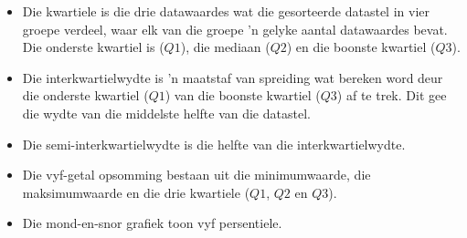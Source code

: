\begin{itemize}[itemsep=6pt]
\item Die kwartiele is die drie datawaardes wat die gesorteerde datastel in vier groepe verdeel, waar elk van die groepe ’n gelyke aantal datawaardes bevat. Die onderste kwartiel is ($Q1$), die mediaan ($Q2$) en die boonste kwartiel ($Q3$).

\item Die interkwartielwydte is ’n maatstaf van spreiding wat bereken word deur die onderste kwartiel ($Q1$) van die boonste kwartiel ($Q3$) af te trek. Dit gee die wydte van die middelste helfte van die datastel.

\item Die semi-interkwartielwydte is die helfte van die interkwartielwydte. 

\item Die vyf-getal opsomming bestaan uit die minimumwaarde, die maksimumwaarde en die drie kwartiele ($Q1$, $Q2$ en $Q3$). 

\item Die mond-en-snor grafiek toon vyf persentiele.
\end{itemize}

